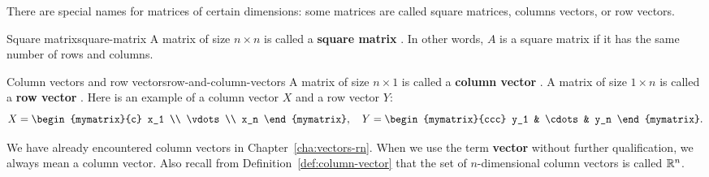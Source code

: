 There are special names for matrices of certain dimensions: some
matrices are called square matrices, columns vectors, or row vectors.

\begin{definition}{Square matrix}{square-matrix}
  A matrix of size $n\times n$ is called a \textbf{square matrix}%
  .  In other words, $A$ is a square matrix if it
  has the same number of rows and columns.
\end{definition}

\begin{definition}{Column vectors and row vectors}{row-and-column-vectors}
  A matrix of size $n\times 1$ is called a \textbf{column vector}%
  . A matrix of size $1\times n$ is called a
  \textbf{row vector}%
  .  Here is an example of a column vector $X$ and a
  row vector $Y$:
  \begin{equation*}
    X=\begin{mymatrix}{c}
      x_1 \\
      \vdots \\
      x_n
    \end{mymatrix},
    \quad
    Y = \begin{mymatrix}{ccc}
      y_1 & \cdots & y_n
    \end{mymatrix}.
  \end{equation*}
\end{definition}

We have already encountered column vectors in
Chapter~\ref{cha:vectors-rn}.  When we use the term \textbf{vector}
without further qualification, we always mean a column vector. Also
recall from Definition~\ref{def:column-vector} that the set of
$n$-dimensional column vectors is called $\mathbb{R}^n$.

